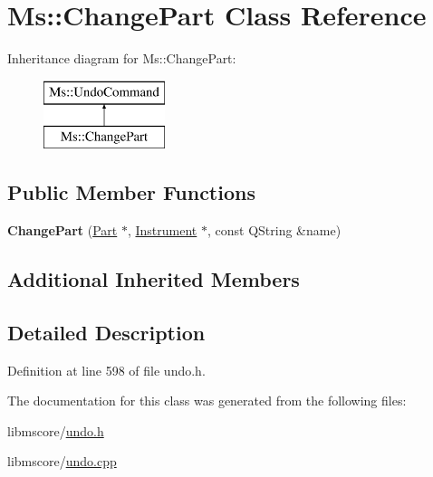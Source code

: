 \hypertarget{class_ms_1_1_change_part}{}\section{Ms\+:\+:Change\+Part Class Reference}
\label{class_ms_1_1_change_part}
Inheritance diagram for Ms\+:\+:Change\+Part\+:\begin{figure}[H]
\begin{center}
\leavevmode
\includegraphics[height=2.000000cm]{class_ms_1_1_change_part}
\end{center}
\end{figure}
\subsection*{Public Member Functions}
\begin{DoxyCompactItemize}
\item 
\mbox{\label{class_ms_1_1_change_part_a1a11a2af9f94354047bf4f3a92aa155a}} 
{\bfseries Change\+Part} (\hyperlink{class_ms_1_1_part}{Part} $\ast$, \hyperlink{class_ms_1_1_instrument}{Instrument} $\ast$, const Q\+String \&name)
\end{DoxyCompactItemize}
\subsection*{Additional Inherited Members}


\subsection{Detailed Description}


Definition at line 598 of file undo.\+h.



The documentation for this class was generated from the following files\+:\begin{DoxyCompactItemize}
\item 
libmscore/\hyperlink{undo_8h}{undo.\+h}\item 
libmscore/\hyperlink{undo_8cpp}{undo.\+cpp}\end{DoxyCompactItemize}
